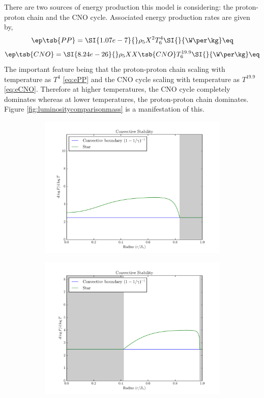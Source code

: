 \documentclass[11pt]{article}
\begin{document}
    There are two sources of energy production this model is considering: the proton-proton chain and the CNO cycle. Associated energy production rates are given by,
    \[ \ep\tsb{PP} = \SI{1.07e-7}{}\rho_5 X^2 T_6^4 \SI{}{\W\per\kg} \eq \label{eq:ePP}\]
    \[ \ep\tsb{CNO} = \SI{8.24e-26}{}\rho_5 X X\tsb{CNO} T_6^{19.9} \SI{}{\W\per\kg} \eq \label{eq:eCNO}\]
    The important feature being that the proton-proton chain scaling with temperature as $T^4$ \eqref{eq:ePP} and the CNO cycle scaling with temperature as $T^{19.9}$ \eqref{eq:eCNO}. Therefore at higher temperatures, the CNO cycle completely dominates whereas at lower temperatures, the proton-proton chain dominates. Figure \ref{fig:luminositycomparisonmass} is a manifestation of this.

    \begin{center}
        \begin{figure}[H]
            \begin{subfigure}{.5\textwidth}
                \centering
                \includegraphics[width=1.1\textwidth]{figures/lowmass/dlogP_dlogT.pdf}
            \end{subfigure}
            \begin{subfigure}{.5\textwidth}
                \centering
                \includegraphics[width=1.1\textwidth]{figures/highmass/dlogP_dlogT.pdf}

\end{subfigure}
\end{figure}
\end{center}
\end{document}
